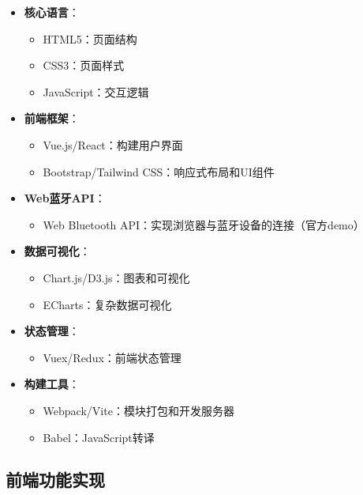 \documentclass[a4paper,12pt]{article}
\begin{document}
\begin{itemize}
  \item \textbf{核心语言}：
    \begin{itemize}
      \item HTML5：页面结构
      \item CSS3：页面样式
      \item JavaScript：交互逻辑
    \end{itemize}
  
  \item \textbf{前端框架}：
    \begin{itemize}
      \item Vue.js/React：构建用户界面
      \item Bootstrap/Tailwind CSS：响应式布局和UI组件
    \end{itemize}
  
  \item \textbf{Web蓝牙API}：
    \begin{itemize}
      \item Web Bluetooth API：实现浏览器与蓝牙设备的连接（官方demo）
    \end{itemize}
  
  \item \textbf{数据可视化}：
    \begin{itemize}
      \item Chart.js/D3.js：图表和可视化
      \item ECharts：复杂数据可视化
    \end{itemize}
  
  \item \textbf{状态管理}：
    \begin{itemize}
      \item Vuex/Redux：前端状态管理
    \end{itemize}
  
  \item \textbf{构建工具}：
    \begin{itemize}
      \item Webpack/Vite：模块打包和开发服务器
      \item Babel：JavaScript转译
    \end{itemize}
\end{itemize}

\subsection{前端功能实现}
\end{document}
